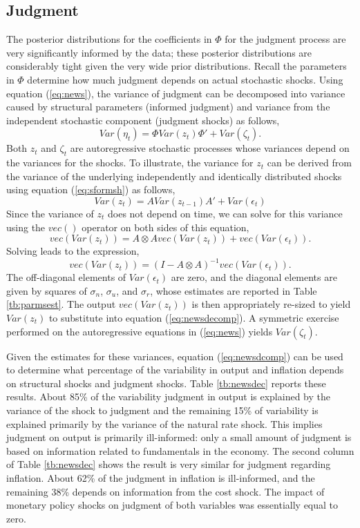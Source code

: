 \documentclass[10pt]{article}
\newcommand{\beq}{\begin{equation}}
\newcommand{\eeq}{\end{equation}}
\newcommand{\bdm}{\begin{displaymath}}
\newcommand{\edm}{\end{displaymath}}
\begin{document}
{\subsection{Judgment}
The posterior distributions for the coefficients in $\Phi$ for the judgment process are very significantly informed by the data; these posterior distributions are considerably tight given the very wide prior distributions.  Recall the parameters in $\Phi$ determine how much judgment depends on actual stochastic shocks.  Using equation (\ref{eq:news}), the variance of judgment can be decomposed into variance caused by structural parameters (informed judgment) and variance from the independent stochastic component (judgment shocks) as follows,
\beq \label{eq:newsdecomp} Var(\eta_t) = \Phi Var(z_t) \Phi' + Var(\zeta_t). \eeq
Both $z_t$ and $\zeta_t$ are autoregressive stochastic processes whose variances depend on the variances for the shocks.  To illustrate, the variance for $z_t$ can be derived from the variance of the underlying independently and identically distributed shocks using equation (\ref{eq:sformsh}) as follows,
\bdm Var(z_t) = A Var(z_{t-1}) A' + Var(\epsilon_t) \edm
Since the variance of $z_t$ does not depend on time, we can solve for this variance using the $vec()$ operator on both sides of this equation,
\bdm vec(Var(z_t)) = A \otimes A vec(Var(z_t)) + vec(Var(\epsilon_t)). \edm
Solving leads to the expression,
\beq \label{eq:newsdcomp} vec(Var(z_t)) = (I - A \otimes A)^{-1} vec(Var(\epsilon_t)). \eeq
The off-diagonal elements of $Var(\epsilon_t)$ are zero, and the diagonal elements are given by squares of $\sigma_n$, $\sigma_u$, and $\sigma_r$, whose estimates are reported in Table \ref{tb:parmsest}.  The output $vec(Var(z_t))$ is then appropriately re-sized to yield $Var(z_t)$ to substitute into equation (\ref{eq:newsdecomp}).  A symmetric exercise performed on the autoregressive equations in (\ref{eq:news}) yields $Var(\zeta_t)$.  

Given the estimates for these variances, equation (\ref{eq:newsdcomp}) can be used to determine what percentage of the variability in output and inflation depends on structural shocks and judgment shocks.  Table \ref{tb:newsdec} reports these results.  About 85\% of the variability judgment in output is explained by the variance of the shock to judgment and the remaining 15\% of variability is explained primarily by the variance of the natural rate shock.  This implies judgment on output is primarily ill-informed: only a small amount of judgment is based on information related to fundamentals in the economy.  The second column of Table \ref{tb:newsdec} shows the result is very similar for judgment regarding inflation.  About 62\% of the judgment in inflation is ill-informed, and the remaining 38\% depends on information from the cost shock.  The impact of monetary policy shocks on judgment of both variables was essentially equal to zero.

}
\end{document}
